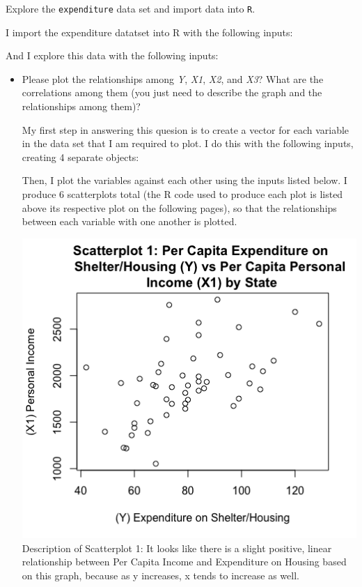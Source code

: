 \documentclass[12pt,letterpaper]{article}
\begin{document}
	\vspace{.5cm}
	\noindent Explore the \texttt{expenditure} data set and import data into \texttt{R}.
	\vspace{.5cm}
	
	I import the expenditure datatset into R with the following inputs:
	  
	
	And I explore this data with the following inputs:
	 
	\vspace{.5cm}
	
	\begin{itemize}
		
		\item
		Please plot the relationships among \emph{Y}, \emph{X1}, \emph{X2}, and \emph{X3}? What are the correlations among them (you just need to describe the graph and the relationships among them)?
		\vspace{.5cm}
		
		My first step in answering this quesion is to create a vector for each variable in the data set that I am required to plot.  I do this with the following inputs, creating 4 separate objects:
		
		 
		
		Then, I plot the variables against each other using the inputs listed below. I produce 6 scatterplots total (the R code used to produce each plot is listed above its respective plot on the following pages), so that the relationships between each variable with one another is plotted.
		
		\newpage
		 
		
		\begin{center}	
		\includegraphics[scale=.80]{Scatterplot1.png}
		Description of Scatterplot 1: It looks like there is a slight positive, linear relationship between Per Capita Income and Expenditure on Housing based on this graph, because as y increases, x tends to increase as well.
		\end{center}
	

\end{itemize}
\end{document}
